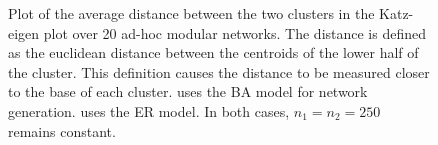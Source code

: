 \documentclass{IEEEtran}
\begin{document}
	\begin{figure}
		\centering
		\caption{Plot of the average distance between the two clusters in the Katz-eigen plot over 20 ad-hoc modular networks. The distance is defined as the euclidean distance between the centroids of the lower half of the cluster. This definition causes the distance to be measured closer to the base of each cluster.  uses the BA model for network generation.  uses the ER model. In both cases, $n_1=n_2=250$ remains constant.}
		\label{fig:dist}
	\end{figure}
	
	
\end{document}
